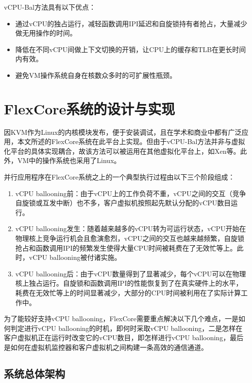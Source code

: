 vCPU-Bal方法具有以下优点：

\begin{itemize}
\item{通过vCPU的独占运行，减轻函数调用IPI延迟和自旋锁持有者抢占，大量减少做无用操作的时间。}
\item{降低在不同vCPU间做上下文切换的开销，让CPU上的缓存和TLB在更长时间内有效。}
\item{避免VM操作系统自身在核数众多时的可扩展性瓶颈。}
\end{itemize}



\section{FlexCore系统的设计与实现}

因KVM\cite{kivity2007kvm}作为Linux的内核模块发布，便于安装调试，且在学术和商业中都有广泛应用，本文所述的FlexCore系统在此平台上实现。但由于vCPU-Bal方法并非与虚拟化平台的具体实现耦合，故该方法可以被运用在其他虚拟化平台上，如Xen\cite{barham2003xen}等。此外，VM中的操作系统也采用了Linux。

并行应用程序在FlexCore系统之上的一个典型执行过程由以下三个阶段组成：

\begin{enumerate}
\item vCPU ballooning前：由于vCPU上的工作负荷不重，vCPU之间的交互（竞争自旋锁或互发中断）也不多，客户虚拟机按照起先默认分配的vCPU数目运行。
\item vCPU ballooning发生：随着越来越多的vCPU转为可运行状态，vCPU开始在物理核上竞争运行机会且愈演愈烈，vCPU之间的交互也越来越频繁，自旋锁抢占和函数调用IPI的频繁发生使得大量CPU时间被耗费在了无效忙等上。此时，vCPU ballooning被付诸实施。
\item vCPU ballooning后：由于vCPU数量得到了显著减少，每个vCPU可以在物理核上独占运行。自旋锁和函数调用IPI的性能恢复到了在真实硬件上的水平，耗费在无效忙等上的时间显著减少，大部分的CPU时间被利用在了实际计算工作中。
\end{enumerate}

为了能较好支持vCPU ballooning，FlexCore需要重点解决以下几个难点，一是如何判定进行vCPU ballooning的时机，即何时采取vCPU ballooning，二是怎样在客户虚拟机正在运行时改变它的vCPU数目，即怎样进行vCPU ballooning，最后是如何在虚拟机监控器和客户虚拟机之间构建一条高效的通信通道。

\subsection{系统总体架构}


